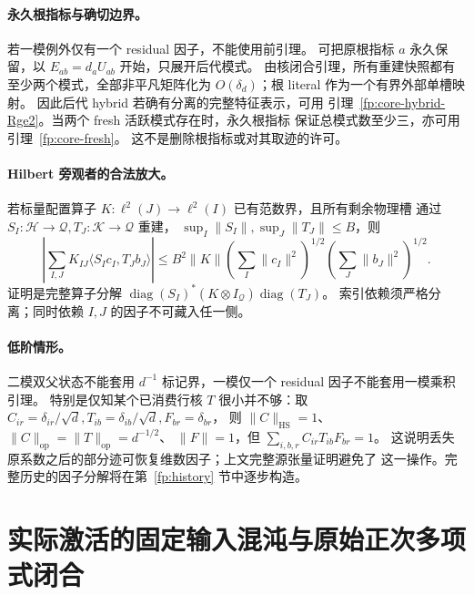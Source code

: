 \documentclass[a4paper]{tufte-handout}
\begin{document}
\begin{fullwidth}
\paragraph{永久根指标与确切边界。}
\label{fp:core-spectator}
若一模例外仅有一个 residual 因子，不能使用前引理。
可把原根指标 $a$ 永久保留，以 $E_{ab}=d_aU_{ab}$ 开始，只展开后代模式。
由核闭合引理，所有重建快照都有至少两个模式，全部非平凡矩阵化为
$O(\delta_d)$；根 literal 作为一个有界外部单槽映射。
因此后代 hybrid 若确有分离的完整特征表示，可用
引理~\ref{fp:core-hybrid-Rge2}。当两个 fresh 活跃模式存在时，永久根指标
保证总模式数至少三，亦可用引理~\ref{fp:core-fresh}。
这不是删除根指标或对其取迹的许可。

\paragraph{Hilbert 旁观者的合法放大。}
\label{fp:core-amplification}
若标量配置算子 $K:\ell^2(J)\to\ell^2(I)$ 已有范数界，且所有剩余物理槽
通过 $S_I:\mathcal H\to\mathcal Q,T_J:\mathcal K\to\mathcal Q$ 重建，
$\sup_I\|S_I\|,\sup_J\|T_J\|\leq B$，则
\[
 \left|\sum_{I,J}K_{IJ}\langle S_Ic_I,T_Jb_J\rangle\right|
 \leq B^2\|K\|\left(\sum_I\|c_I\|^2\right)^{1/2}
                   \left(\sum_J\|b_J\|^2\right)^{1/2}.
\]
证明是完整算子分解
$\operatorname{diag}(S_I)^*(K\otimes I_{\mathcal Q})\operatorname{diag}(T_J)$。
索引依赖须严格分离；同时依赖 $I,J$ 的因子不可藏入任一侧。

\paragraph{低阶情形。}
二模双父状态不能套用
$d^{-1}$ 标记界，一模仅一个 residual 因子不能套用一模乘积引理。
特别是仅知某个已消费行核 $T$ 很小并不够：取
$C_{ir}=\delta_{ir}/\sqrt d,T_{ib}=\delta_{ib}/\sqrt d,F_{br}=\delta_{br}$，
则 $\|C\|_{\mathrm{HS}}=1$、$\|C\|_{\mathrm{op}}=\|T\|_{\mathrm{op}}=d^{-1/2}$、
$\|F\|=1$，但 $\sum_{i,b,r}C_{ir}T_{ib}F_{br}=1$。
这说明丢失原系数之后的部分迹可恢复维数因子；上文完整源张量证明避免了
这一操作。完整历史的因子分解将在第~\ref{fp:history} 节中逐步构造。

\section{实际激活的固定输入混沌与原始正次多项式闭合}
\label{fp:actual-section}\label{app:closure}


\end{fullwidth}
\end{document}
